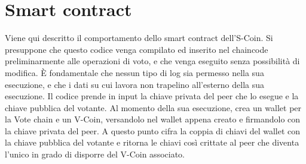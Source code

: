 \section{Smart contract} \label{sec:smart_contract}
	Viene qui descritto il comportamento dello smart contract dell'S-Coin. Si presuppone che questo codice venga compilato ed inserito nel chaincode preliminarmente alle operazioni di voto, e che venga eseguito senza possibilità di modifica. È fondamentale che nessun tipo di log sia permesso nella sua esecuzione, e che i dati su cui lavora non trapelino all'esterno della sua esecuzione. Il codice prende in input la chiave privata del peer che lo esegue e la chiave pubblica del votante. Al momento della sua esecuzione, crea un wallet per la Vote chain e un V-Coin, versandolo nel wallet appena creato e firmandolo con la chiave privata del peer. A questo punto cifra la coppia di chiavi del wallet con la chiave pubblica del votante e ritorna le chiavi così crittate al peer che diventa l'unico in grado di disporre del V-Coin associato.
